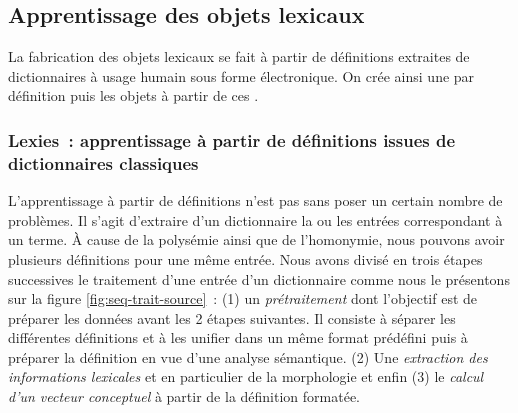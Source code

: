 \subsection{Apprentissage des objets lexicaux}
\label{sec:appr-vecteurs}

La fabrication des objets lexicaux
se fait à partir de définitions extraites de dictionnaires à usage
humain sous forme électronique. On crée ainsi une  par
définition puis les objets  à partir de ces
.


\subsubsection{Lexies~: apprentissage à partir de définitions issues de
  dictionnaires classiques}

L'apprentissage à partir de définitions n'est pas sans poser un
certain nombre de problèmes. Il s'agit d'extraire d'un dictionnaire la
ou les entrées correspondant à un terme. À cause de la polysémie ainsi
que de l'homonymie, nous pouvons avoir plusieurs définitions pour une
même entrée. Nous avons divisé en trois étapes successives le
traitement d'une entrée d'un dictionnaire comme nous le présentons sur
la figure \ref{fig:seq-trait-source}~: (1) un \emph{prétraitement}
dont l'objectif est de préparer les données avant les 2 étapes
suivantes.  Il consiste à séparer les différentes définitions et à les
unifier dans un même format prédéfini puis à préparer la définition en
vue d'une analyse sémantique. (2) Une \emph{extraction des
  informations lexicales} et en particulier de la morphologie et enfin
(3) le \emph{calcul d'un vecteur conceptuel} à partir de la définition
formatée.

